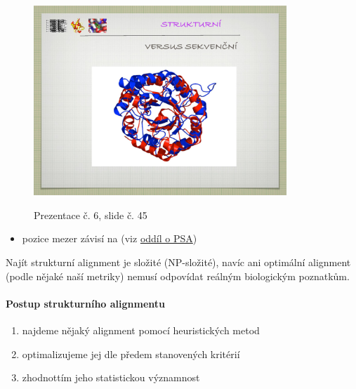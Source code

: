 \documentclass[DIV=8]{scrreprt}
\begin{document}
\begin{itemize}[nosep]
\begin{figure}
    \centering
    \label{slides-6-slide-43}
\end{figure}
\begin{figure}
    \caption{Prezentace č. 6, slide č. 45}
    \includegraphics[width=0.85\textwidth]{slides-6/slide-45.jpg}
    \centering
    \label{slides-6-slide-45}
\end{figure}

\begin{itemize}[nosep]
    \item pozice mezer závisí na (viz \href{Pairwise sequence alignment}{oddíl o PSA})
\end{itemize}

\end{itemize}



Najít strukturní alignment je složité (NP-složité), navíc ani optimální alignment (podle nějaké naší metriky) nemusí odpovídat reálným biologickým poznatkům.

\paragraph{Postup strukturního alignmentu}
\begin{enumerate}[nosep]
    \item najdeme nějaký alignment pomocí heuristických metod
    \item optimalizujeme jej dle předem stanovených kritérií
    \item zhodnottím jeho statistickou významnost
\end{enumerate}
\end{document}

